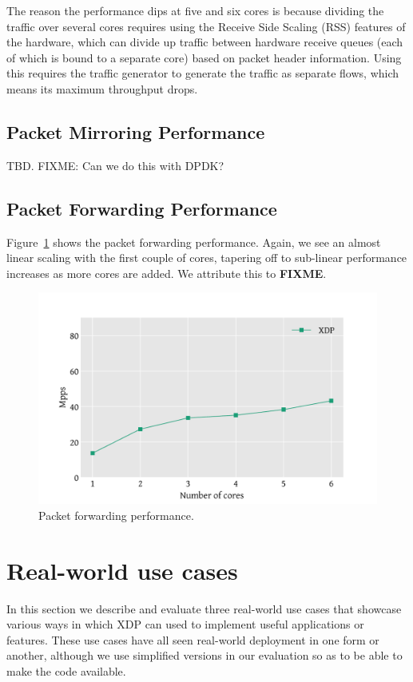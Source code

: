 \documentclass[10pt,sigconf]{acmart}
\begin{document}
The reason the performance dips at five and six cores is because dividing the
traffic over several cores requires using the Receive Side Scaling (RSS)
features of the hardware, which can divide up traffic between hardware receive
queues (each of which is bound to a separate core) based on packet header
information. Using this requires the traffic generator to generate the traffic
as separate flows, which means its maximum throughput drops.

\subsection{Packet Mirroring Performance}
\label{sec:pack-mirr-perf}

TBD. FIXME: Can we do this with DPDK?

\subsection{Packet Forwarding Performance}
\label{sec:pack-forw-perf}
Figure~\ref{fig:redirect-test} shows the packet forwarding performance. Again,
we see an almost linear scaling with the first couple of cores, tapering off to
sub-linear performance increases as more cores are added. We attribute this to
\textbf{FIXME}.


\begin{figure}[t]
\centering
\includegraphics[width=\linewidth]{figures/redirect-test.pdf}
\caption{\label{fig:redirect-test} Packet forwarding performance.}
\end{figure}

\section{Real-world use cases}
\label{sec:usecases}
In this section we describe and evaluate three real-world use cases that
showcase various ways in which XDP can used to implement useful applications or
features. These use cases have all seen real-world deployment in one form or
another, although we use simplified versions in our evaluation so as to be able
to make the code available.
\end{document}

